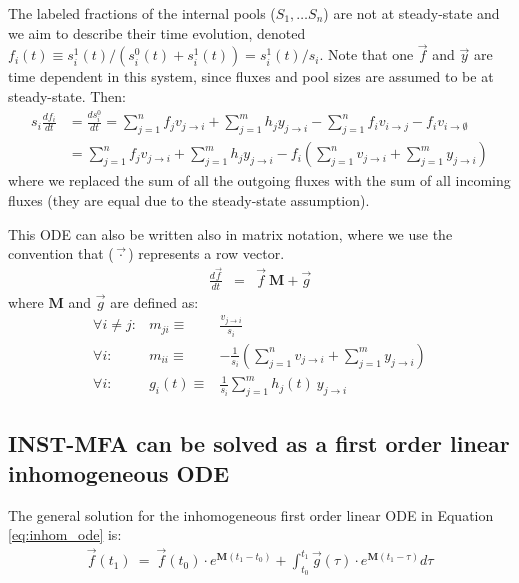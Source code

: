 \documentclass{article}
\newcommand{\flux}[2]{\ensuremath{v_{{#1} \rightarrow {#2}}}}
\begin{document}
The labeled fractions of the internal pools ($S_1, \ldots S_n$) are not at steady-state and we aim to describe their time evolution, denoted $f_i(t) \equiv s_i^1(t) / (s_i^0(t) + s_i^1(t)) = s_i^1(t) / s_i$. Note that one $\vec{f}$ and $\vec{y}$ are time dependent in this system, since fluxes and pool sizes are assumed to be at steady-state. Then:
\begin{align}
    s_i \frac{d f_i}{dt} 
    &= \frac{d s_i^0}{dt}
    = \sum_{j=1}^{n} f_j\flux{j}{i} + \sum_{j=1}^m h_j y_{j \rightarrow i} - \sum_{j=1}^n f_i \flux{i}{j} - f_i \flux{i}{\emptyset}\nonumber\\
    &= \sum_{j=1}^{n} f_j\flux{j}{i} + \sum_{j=1}^m h_j y_{j \rightarrow i} - f_i \left( \sum_{j=1}^n \flux{j}{i} + \sum_{j=1}^m y_{j \rightarrow i}\right) \label{eq:steady_state}
\end{align}
where we replaced the sum of all the outgoing fluxes with the sum of all incoming fluxes (they are equal due to the steady-state assumption).

This ODE can also be written also in matrix notation, where we use the convention that ($\vec{\cdot}$) represents a row vector.
\begin{eqnarray}\label{eq:inhom_ode}
	\frac{d\vec{f}}{dt} &=& \vec{f}~\mathbf{M} + \vec{g}
\end{eqnarray}
where $\mathbf{M}$ and $\vec{g}$ are defined as:
\begin{eqnarray}
    \forall i \neq j:& m_{ji} \equiv& \frac{\flux{j}{i}}{s_i} \\
    \forall i:& m_{ii} \equiv& -\frac{1}{s_i} \left(\sum_{j=1}^n \flux{j}{i} + \sum_{j=1}^m y_{j \rightarrow i} \right)\\
    \forall i:& g_{i}(t) \equiv& \frac{1}{s_i} \sum_{j=1}^m h_j(t)~y_{j \rightarrow i}
\end{eqnarray}

\subsection{INST-MFA can be solved as a first order linear inhomogeneous ODE}
The general solution \cite{young_elementary_2008} for the inhomogeneous first order linear ODE in Equation \ref{eq:inhom_ode} is:
\begin{eqnarray}\label{eq:inhom_ode_sol}
    \vec{f}(t_1) ~=~ \vec{f}(t_0) \cdot e^{\mathbf{M} (t_1 - t_0)} + \int_{t_0}^{t_1} \vec{g}(\tau) \cdot e^{\mathbf{M} (t_1 - \tau)} d\tau
\end{eqnarray}
\end{document}

